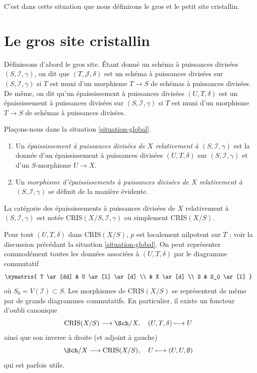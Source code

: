 \noindent
C'est dans cette situation que nous définirons le gros et le petit
site cristallin.









\section{Le gros site cristallin}
\label{section-big-site}

\noindent
Définissons d'abord le gros site. Étant donné un schéma à puissances divisées
$(S, \mathcal{I}, \gamma)$, on dit que $(T, \mathcal{J}, \delta)$ est
un schéma à puissances divisées sur $(S, \mathcal{I}, \gamma)$ si
$T$ est muni d'un morphisme $T \to S$ de schémas à puissances
divisées. De même, on dit qu'un épaississement à puissances divisées $(U, T, \delta)$
est un épaississement à puissances divisées sur $(S, \mathcal{I}, \gamma)$
si $T$ est muni d'un morphisme $T \to S$ de schémas à puissances
divisées.

\begin{definition}
\label{definition-divided-power-thickening-X}
Plaçons-nous dans la situation \ref{situation-global}.
\begin{enumerate}
\item Un {\it épaississement à puissances divisées de $X$ relativement à
$(S, \mathcal{I}, \gamma)$} est la donnée d'un épaississement à puissances divisées
$(U, T, \delta)$ sur $(S, \mathcal{I}, \gamma)$
et d'un $S$-morphisme $U \to X$.
\item Un {\it morphisme d'épaississements à puissances divisées de $X$
relativement à $(S, \mathcal{I}, \gamma)$} se définit de la manière
évidente.
\end{enumerate}
La catégorie des épaississements à puissances divisées de $X$ relativement à
$(S, \mathcal{I}, \gamma)$ est notée $\text{CRIS}(X/S, \mathcal{I}, \gamma)$
ou simplement $\text{CRIS}(X/S)$.
\end{definition}

\noindent
Pour tout $(U, T, \delta)$ dans $\text{CRIS}(X/S)$,
$p$ est localement nilpotent sur $T$ ; voir la discussion précédant la
situation \ref{situation-global}.
On peut représenter commodément toutes les données associées à $(U, T, \delta)$
par le diagramme commutatif
$$
\xymatrix{
T \ar[dd] & U \ar[l] \ar[d] \\
& X \ar[d] \\
S & S_0 \ar[l]
}
$$
où $S_0 = V(\mathcal{I}) \subset S$. Les morphismes de $\text{CRIS}(X/S)$
se représentent de même par de grands diagrammes commutatifs. En particulier,
il existe un foncteur d'oubli canonique
\begin{equation}
\label{equation-forget}
\text{CRIS}(X/S) \longrightarrow \Sch/X,\quad
(U, T, \delta) \longmapsto U
\end{equation}
ainsi que son inverse à droite (et adjoint à gauche)
\begin{equation}
\label{equation-endow-trivial}
\Sch/X \longrightarrow \text{CRIS}(X/S),\quad
U \longmapsto (U, U, \emptyset)
\end{equation}
qui est parfois utile.

